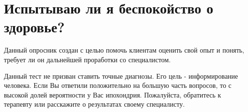 \documentclass{survey}
\begin{document}
\section*{\huge{Испытываю ли я беспокойство о здоровье?}}

\begin{flushleft}
Данный опросник создан с целью помочь клиентам оценить свой опыт и понять, требует ли он дальнейшей проработки со специалистом.
\end{flushleft}






\begin{flushleft}
Данный тест не призван ставить точные диагнозы. Его цель - информирование человека. Если Вы ответили положительно на большую часть вопросов, то с высокой долей вероятности у Вас ипохондрия. Пожалуйста, обратитесь к терапевту или расскажите о результатах своему специалисту.
\end{flushleft}
\end{document}
